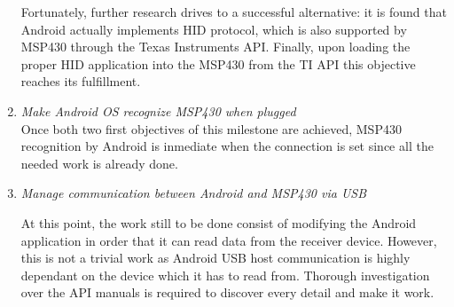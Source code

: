 \begin{enumerate}
				Fortunately, further research drives to a successful alternative: it is found that Android actually
				implements HID protocol, which is also supported by MSP430 through the Texas Instruments API. Finally,
				upon loading the proper HID application into the MSP430 from the TI API this objective reaches its fulfillment.
			\item \emph{Make Android OS recognize MSP430 when plugged}\\
				Once both two first objectives of this milestone are achieved, MSP430 recognition by Android is
				inmediate when the connection is set since all the needed work is already done.
			\item \emph{Manage communication between Android and MSP430 via USB}
				\begin{comment}
				That great news helps the android development team, than in this moment becomes the full team, 
				to succesfully imlements the android USB host communication in our aplication in just a weekend. 
				Android USB host comunication was higly dependant of what device was in the other side of the 
				communication, thus everybody was needed in this hard and delicated part of the develop to 
				investigate the high cuantity of manuals contained in the API in orther to find and implement 
				all this particularities. Finally we luckily discover that now, our android and MSP430 can 
				also comunicate each other trought our aplication. \\
				\end{comment}
				At this point, the work still to be done consist of modifying the Android application in order
				that it can read data from the receiver device. However, this is not a trivial work as Android
				USB host communication is highly dependant on the device which it has to read from. Thorough
				investigation over the API manuals is required to discover every detail and make it work.
		\end{enumerate}

